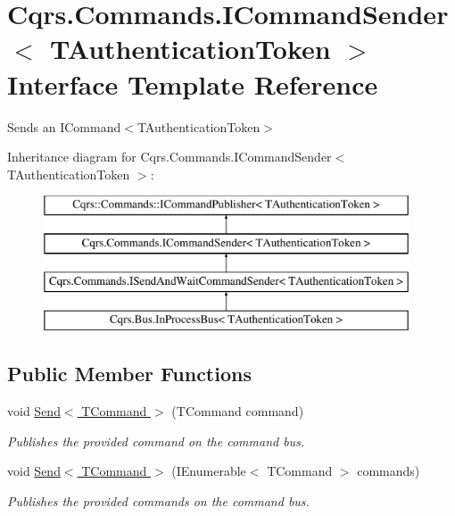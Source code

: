 \hypertarget{interfaceCqrs_1_1Commands_1_1ICommandSender}{}\section{Cqrs.\+Commands.\+I\+Command\+Sender$<$ T\+Authentication\+Token $>$ Interface Template Reference}
\label{interfaceCqrs_1_1Commands_1_1ICommandSender}


Sends an I\+Command$<$\+T\+Authentication\+Token$>$  


Inheritance diagram for Cqrs.\+Commands.\+I\+Command\+Sender$<$ T\+Authentication\+Token $>$\+:\begin{figure}[H]
\begin{center}
\leavevmode
\includegraphics[height=4.000000cm]{interfaceCqrs_1_1Commands_1_1ICommandSender}
\end{center}
\end{figure}
\subsection*{Public Member Functions}
\begin{DoxyCompactItemize}
\item 
void \hyperlink{interfaceCqrs_1_1Commands_1_1ICommandSender_a551d69f8679399fc0ce0fd99dead507a_a551d69f8679399fc0ce0fd99dead507a}{Send$<$ T\+Command $>$} (T\+Command command)
\begin{DoxyCompactList}\small\item\em Publishes the provided {\itshape command}  on the command bus. \end{DoxyCompactList}\item 
void \hyperlink{interfaceCqrs_1_1Commands_1_1ICommandSender_a3fb3ec40a3e862f721a7c9204e67e832_a3fb3ec40a3e862f721a7c9204e67e832}{Send$<$ T\+Command $>$} (I\+Enumerable$<$ T\+Command $>$ commands)
\begin{DoxyCompactList}\small\item\em Publishes the provided {\itshape commands}  on the command bus. \end{DoxyCompactList}\end{DoxyCompactItemize}



